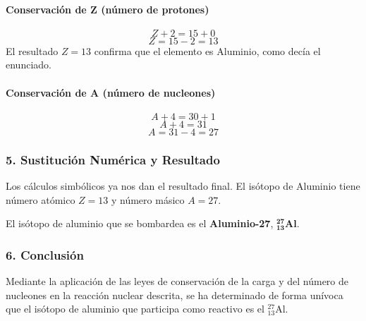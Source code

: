 \paragraph{Conservación de Z (número de protones)}
$$ Z + 2 = 15 + 0 $$
$$ Z = 15 - 2 = 13 $$
El resultado $Z=13$ confirma que el elemento es Aluminio, como decía el enunciado.

\paragraph{Conservación de A (número de nucleones)}
$$ A + 4 = 30 + 1 $$
$$ A + 4 = 31 $$
$$ A = 31 - 4 = 27 $$

\subsubsection*{5. Sustitución Numérica y Resultado}
Los cálculos simbólicos ya nos dan el resultado final. El isótopo de Aluminio tiene número atómico $Z=13$ y número másico $A=27$.
\begin{cajaresultado}
El isótopo de aluminio que se bombardea es el \textbf{Aluminio-27}, $\boldsymbol{{}_{13}^{27}\text{Al}}$.
\end{cajaresultado}

\subsubsection*{6. Conclusión}
\begin{cajaconclusion}
Mediante la aplicación de las leyes de conservación de la carga y del número de nucleones en la reacción nuclear descrita, se ha determinado de forma unívoca que el isótopo de aluminio que participa como reactivo es el ${}_{13}^{27}\text{Al}$.
\end{cajaconclusion}

\newpage